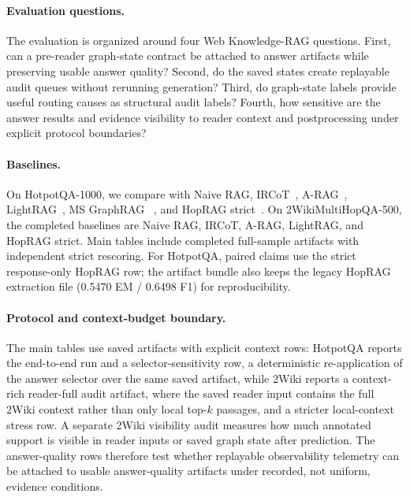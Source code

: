 \documentclass[runningheads,a4paper]{llncs}
\begin{document}
\paragraph{Evaluation questions.}
The evaluation is organized around four Web Knowledge-RAG questions. First, can
a pre-reader graph-state contract be attached to answer artifacts while
preserving usable answer quality? Second, do the saved states
create replayable audit queues without rerunning generation? Third, do
graph-state labels provide useful routing causes as structural audit labels?
Fourth, how sensitive are the answer results and evidence visibility to reader
context and postprocessing under explicit protocol boundaries?

\paragraph{Baselines.}
On HotpotQA-1000, we compare with Naive RAG, IRCoT~\cite{trivedi2022ircot},
A-RAG~\cite{arag2026}, LightRAG~\cite{guo2024lightrag}, MS GraphRAG
~\cite{edge2024graphrag}, and HopRAG strict~\cite{yu2025hoprag}. On
2WikiMultiHopQA-500, the completed baselines are Naive RAG, IRCoT, A-RAG,
LightRAG, and HopRAG strict. Main tables include completed full-sample artifacts
with independent strict rescoring. For HotpotQA, paired claims use the strict
response-only HopRAG row; the artifact bundle also keeps the legacy HopRAG
extraction file (0.5470 EM / 0.6498 F1) for reproducibility.

\paragraph{Protocol and context-budget boundary.}
The main tables use saved artifacts with explicit context rows: HotpotQA reports
the end-to-end run and a selector-sensitivity row, a deterministic
re-application of the answer selector over the same saved artifact, while 2Wiki
reports a context-rich reader-full audit artifact, where the saved reader input
contains the full 2Wiki context rather than only local top-$k$ passages, and a
stricter local-context stress row. A separate 2Wiki
visibility audit measures how much annotated support is visible in reader inputs
or saved graph state after prediction. The answer-quality rows therefore test whether replayable
observability telemetry can be attached to usable answer-quality artifacts under
recorded, not uniform, evidence conditions.
\end{document}
